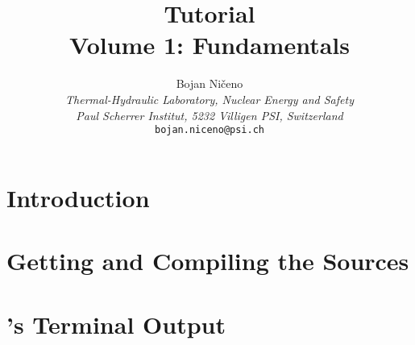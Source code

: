 \documentclass[a4paper]{book}
\begin{document}
  \title{ {\Huge {\bfseries\psiboil} {\bf Tutorial}} \\
           \vspace{10mm}
          {\huge {\bf Volume 1: Fundamentals} } }

  \author{{\Large Bojan Ni\v{c}eno}                                     \\
          {\em Thermal-Hydraulic Laboratory, Nuclear Energy and Safety} \\
          {\em Paul Scherrer Institut, 5232 Villigen PSI, Switzerland}  \\
          {\tt bojan.niceno@psi.ch}}

  \maketitle

  \clearemptydoublepage


  \tableofcontents

  \clearemptydoublepage


  \chapter{Introduction}
  

  \chapter{Getting and Compiling the {\psiboil} Sources}
  
  

  \chapter{{\psiboil}'s Terminal Output}
  
  
\end{document}
